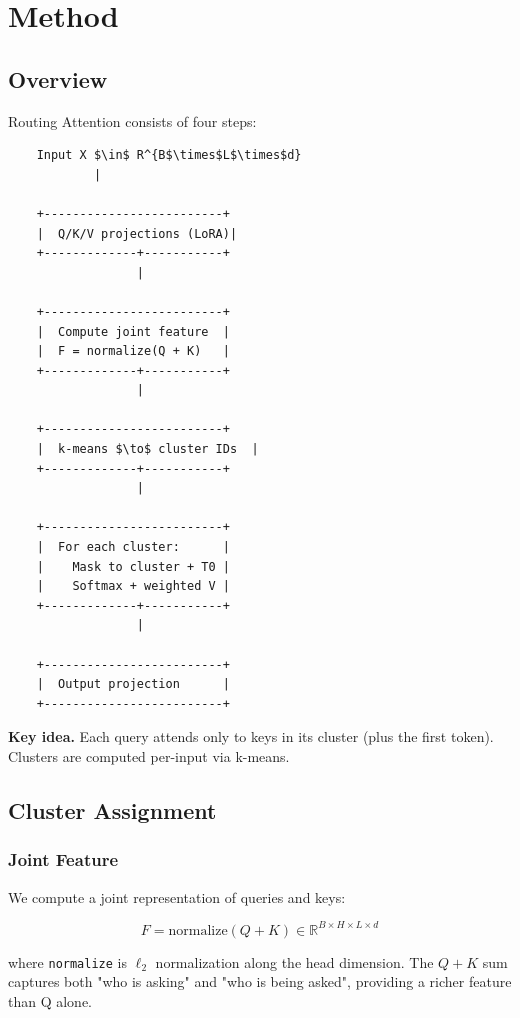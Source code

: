 
\section{Method}

\subsection{Overview}

Routing Attention consists of four steps:

\begin{lstlisting}
    Input X $\in$ R^{B$\times$L$\times$d}
            |
             
    +-------------------------+
    |  Q/K/V projections (LoRA)|
    +-------------+-----------+
                  |
                   
    +-------------------------+
    |  Compute joint feature  |
    |  F = normalize(Q + K)   |
    +-------------+-----------+
                  |
                   
    +-------------------------+
    |  k-means $\to$ cluster IDs  |
    +-------------+-----------+
                  |
                   
    +-------------------------+
    |  For each cluster:      |
    |    Mask to cluster + T0 |
    |    Softmax + weighted V |
    +-------------+-----------+
                  |
                   
    +-------------------------+
    |  Output projection      |
    +-------------------------+
\end{lstlisting}

\textbf{Key idea.} Each query attends only to keys in its cluster (plus the first 
token). Clusters are computed per-input via k-means.

\subsection{Cluster Assignment}

\subsubsection{Joint Feature}

We compute a joint representation of queries and keys:

\[
F = \text{normalize}(Q + K) \in \mathbb{R}^{B \times H \times L \times d}
\tag{4.1}
\]

where \texttt{normalize} is $\ell_2$ normalization along the head dimension. The 
$Q + K$ sum captures both "who is asking" and "who is being asked", 
providing a richer feature than Q alone.

